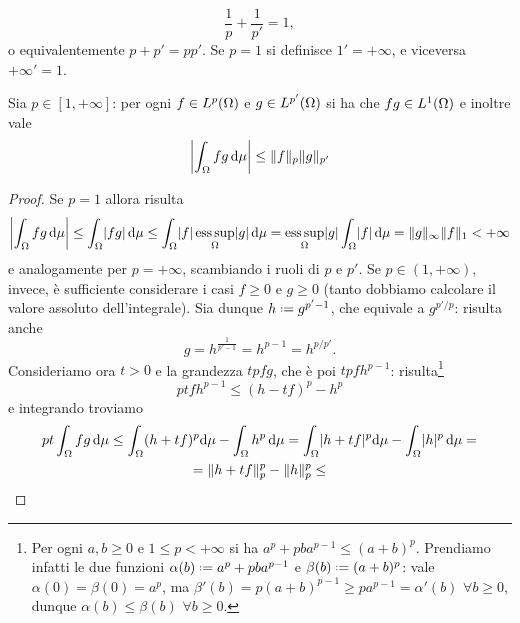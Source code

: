 \begin{equation}
    \frac1{p}+\frac1{p'}=1,
    \label{eq:coniugato-holder}
\end{equation}
o equivalentemente $p+p'=pp'$.
Se $p=1$ si definisce $1'=+\infty$, e viceversa $+\infty'=1$.
\begin{proprieta} \label{pr:disuguaglianza-holder}
    Sia $p\in[1,+\infty]$: per ogni $f\in\leb[p]{\Omega}$ e $g\in\leb[p']{\Omega}$ si ha che $fg\in\leb[1]{\Omega}$ e inoltre vale
    \begin{equation}
        \abs[\bigg]{\int_\Omega fg\,\dd\mu} \le \norm{f}_p\norm{g}_{p'}
        \label{eq:disuguaglianza-holder}
    \end{equation}
\end{proprieta}
\begin{proof}
    Se $p=1$ allora risulta
    \begin{equation}
        \abs[\bigg]{\int_\Omega fg\,\dd\mu}\le
        \int_\Omega\abs{fg}\,\dd\mu\le
        \int_\Omega\abs{f}\esssup_\Omega\abs{g}\,\dd\mu=
        \esssup_\Omega\abs{g}\int_\Omega\abs{f}\,\dd\mu=
        \norm{g}_\infty\norm{f}_1<+\infty
    \end{equation}
    e analogamente per $p=+\infty$, scambiando i ruoli di $p$ e $p'$.
    Se $p\in(1,+\infty)$, invece, è sufficiente considerare i casi $f\ge 0$ e $g\ge 0$ (tanto dobbiamo calcolare il valore assoluto dell'integrale).
    Sia dunque $h\defeq g^{p'-1}$, che equivale a $g^{p'/p}$: risulta anche
    \begin{equation}
        g=h^{\frac1{p'-1}}=h^{p-1}=h^{p/p'}.
    \end{equation}
    Consideriamo ora $t>0$ e la grandezza $tpfg$, che è poi $tpfh^{p-1}$: risulta\footnote{
        Per ogni $a,b\ge 0$ e $1\le p<+\infty$ si ha $a^p+pba^{p-1}\le(a+b)^p$.
        Prendiamo infatti le due funzioni $\alpha(b)\defeq a^p+pba^{p-1}$ e $\beta(b)\defeq (a+b)^p$: vale $\alpha(0)=\beta(0)=a^p$, ma $\beta'(b)=p(a+b)^{p-1}\ge pa^{p-1}=\alpha'(b)$ $\forall b\ge 0$, dunque $\alpha(b)\le\beta(b)$ $\forall b\ge 0$.
    }
    \begin{equation}
        ptfh^{p-1} \le (h-tf)^p-h^p
    \end{equation}
    e integrando troviamo
    \begin{multline}
        pt\int_\Omega fg\,\dd\mu\le
        \int_\Omega (h+tf)^p\dd\mu-\int_\Omega h^p\,\dd\mu=
        \int_\Omega \abs{h+tf}^p\dd\mu-\int_\Omega \abs{h}^p\,\dd\mu=\\=
        \norm{h+tf}_p^p-\norm{h}_p^p\le

\end{multline}
\end{proof}
